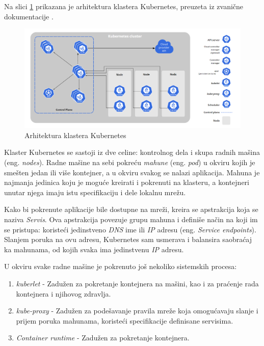 \documentclass[12pt,oneside]{memoir}
\begin{document}
Na slici \ref{fig:kubernetesarh} prikazana je arhitektura klastera Kubernetes, preuzeta iz zvanične dokumentacije \cite{KubernetesArchitecture}.

\begin{figure}[!ht]
  \centering
  \includegraphics[width=1.0\textwidth]{./images/kubernetes_architecture.png}
  \caption{Arhitektura klastera Kubernetes}
  \label{fig:kubernetesarh}
\end{figure}

Klaster Kubernetes se sastoji iz dve celine: kontrolnog dela i skupa radnih mašina (eng. \emph{nodes}). Radne mašine na sebi pokreću \emph{mahune} (eng. \emph{pod}) u okviru kojih je smešten jedan ili više kontejner, a u okviru svakog se nalazi aplikacija. Mahuna je najmanja jedinica koju je moguće kreirati i pokrenuti na klasteru, a kontejneri unutar njega imaju istu specifikaciju i dele lokalnu mrežu.

Kako bi pokrenute aplikacije bile dostupne na mreži, kreira se apstrakcija koja se naziva \emph{Servis}. Ova apstrakcija povezuje grupu mahuna i definiše način na koji im se pristupa: koristeći jedinstveno \emph{DNS} ime ili \emph{IP} adresu (eng. \emph{Service endpoints}). Slanjem poruka na ovu adresu, Kubernetes sam usmerava i balansira saobraćaj ka mahunama, od kojih svaka ima jedinstvenu \emph{IP} adresu.

U okviru svake radne mašine je pokrenuto još nekoliko sistemskih procesa: 
\begin{enumerate}
\item \emph{kuberlet} - Zadužen za pokretanje kontejnera na mašini, kao i za praćenje rada kontejnera i njihovog zdravlja.
\item \emph{kube-proxy} - Zadužen za podešavanje pravila mreže koja omogućavaju slanje i prijem poruka mahunama, koristeći specifikacije definisane servisima.
\item \emph{Container runtime} - Zadužen za pokretanje kontejnera.
\end{enumerate}
\end{document}

